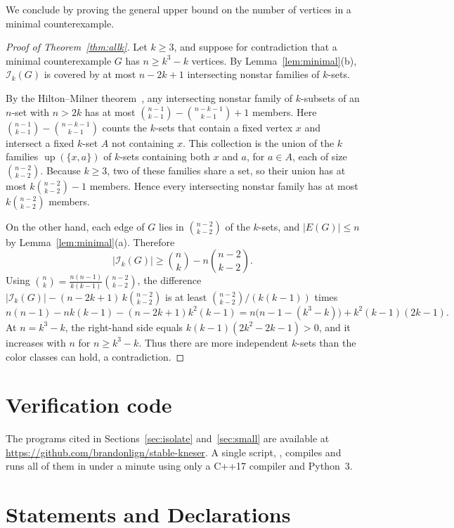 \documentclass[11pt]{amsart}
\theoremstyle{definition}
\theoremstyle{remark}
\numberwithin{equation}{section}
\newcommand{\up}{\operatorname{up}}
\begin{document}
We conclude by proving the general upper bound on the number of vertices in a
minimal counterexample.

\begin{proof}[Proof of Theorem~\ref{thm:allk}]
Let $k\ge3$, and suppose for contradiction that a minimal counterexample $G$
has $n\ge k^3-k$ vertices. By Lemma~\ref{lem:minimal}(b), $\mathcal I_k(G)$ is
covered by at most $n-2k+1$ intersecting nonstar families of $k$-sets.

By the Hilton--Milner theorem~\cite{HM}, any intersecting nonstar family of
$k$-subsets of an $n$-set with $n>2k$ has at most
$\binom{n-1}{k-1}-\binom{n-k-1}{k-1}+1$ members. Here
$\binom{n-1}{k-1}-\binom{n-k-1}{k-1}$ counts the $k$-sets that contain a fixed
vertex $x$ and intersect a fixed $k$-set $A$ not containing $x$. This
collection is the union of the $k$ families $\up(\{x,a\})$ of $k$-sets
containing both $x$ and $a$, for $a\in A$, each of size $\binom{n-2}{k-2}$.
Because $k\ge3$, two of these families share a set, so their union has at most
$k\binom{n-2}{k-2}-1$ members. Hence every intersecting nonstar family has at
most $k\binom{n-2}{k-2}$ members.

On the other hand, each edge of $G$ lies in $\binom{n-2}{k-2}$ of the $k$-sets,
and $|E(G)|\le n$ by Lemma~\ref{lem:minimal}(a). Therefore
\[
|\mathcal I_k(G)|\ge\binom nk-n\binom{n-2}{k-2}.
\]
Using $\binom nk=\frac{n(n-1)}{k(k-1)}\binom{n-2}{k-2}$, the difference
$|\mathcal I_k(G)|-(n-2k+1)\,k\binom{n-2}{k-2}$ is at least
$\binom{n-2}{k-2}/(k(k-1))$ times
\[
n(n-1)-nk(k-1)-(n-2k+1)k^2(k-1)
=n\bigl(n-1-(k^3-k)\bigr)+k^2(k-1)(2k-1).
\]
At $n=k^3-k$, the right-hand side equals $k(k-1)(2k^2-2k-1)>0$, and it
increases with $n$ for $n\ge k^3-k$. Thus there are more independent $k$-sets
than the color classes can hold, a contradiction.
\end{proof}

\section*{Verification code}

The programs cited in Sections~\ref{sec:isolate} and~\ref{sec:small} are
available at\\ \url{https://github.com/brandonlign/stable-kneser}. A single
script, , compiles and runs all of them in under a
minute using only a C++17 compiler and Python~3.

\section*{Statements and Declarations}
\end{document}
